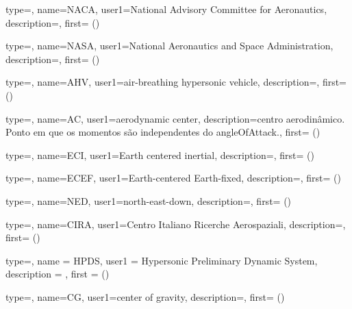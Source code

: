 {type=\acronymtype,
    name={NACA},
    user1={National Advisory Committee for Aeronautics},
    description={},
    first={ ()}
}

{type=\acronymtype,
    name={NASA},
    user1={National Aeronautics and Space Administration},
    description={},
    first={ ()}
}


{type=\acronymtype,
    name={AHV},
    user1={air-breathing hypersonic vehicle},
    description={},
    first={ ()}
}

{type=\acronymtype,
    name={AC},
    user1={aerodynamic center},
    description={centro aerodinâmico. Ponto em que os momentos são independentes do \gls{angleOfAttack}.},
    first={ ()}
}

{type=\acronymtype,
    name={ECI},
    user1={Earth centered inertial},
    description={},
    first={ ()}
}

{type=\acronymtype,
    name={ECEF},
    user1={Earth-centered Earth-fixed},
    description={},
    first={ ()}
}

{type=\acronymtype,
    name={NED},
    user1={north-east-down},
    description={},
    first={ ()}
}

{type=\acronymtype,
    name={CIRA},
    user1={Centro Italiano Ricerche Aerospaziali},
    description={},
    first={ ()}
}

{type=\acronymtype,
    name = {HPDS},
    user1 = {Hypersonic Preliminary Dynamic System},
    description = {},
    first = { ()}
}

{type=\acronymtype,
    name={CG},
    user1={center of gravity},
    description={},
    first={ ()}
}